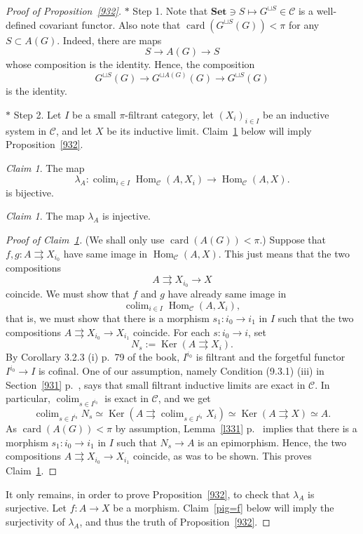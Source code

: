 \documentclass[12pt]{article}
\theoremstyle{remark}
\newtheorem{claim}[thm]{Claim}
\theoremstyle{definition}
\newcommand{\nn}{\noindent}
\newcommand{\C}{\mathcal C}
\newcommand{\Set}{\mathbf{Set}}
\newcommand{\parar}{\rightrightarrows}
\DeclareMathOperator*{\colim}{colim}
\DeclareMathOperator{\card}{card}
\DeclareMathOperator{\Hom}{Hom}
\DeclareMathOperator{\Ker}{Ker}
\begin{document}
\begin{proof}[Proof of Proposition~\ref{932}] 
$*$ Step 1. Note that $\Set\ni S\mapsto G^{\sqcup S}\in\C$ is a well-defined covariant functor. Also note that $\card(G^{\sqcup S}(G))<\pi$ for any $S\subset A(G)$. Indeed, there are maps 
$$
S\to A(G)\to S
$$ 
whose composition is the identity. Hence, the composition 
$$
G^{\sqcup S}(G)\to G^{\sqcup A(G)}(G)\to G^{\sqcup S}(G)
$$ 
is the identity.

\nn$*$ Step 2. Let $I$ be a small $\pi$-filtrant category, let $(X_i)_{i\in I}$ be an inductive system in $\C$, and let $X$ be its inductive limit. Claim~\ref{lbij} below will imply Proposition~\ref{932}. 

\begin{claim}\label{lbij} 
The map 
$$
\lambda_A:\colim_{i\in I}\Hom_\C(A,X_i)\to\Hom_\C(A,X).
$$ 
is bijective. 
\end{claim}

\begin{claim}\label{linj} 
The map $\lambda_A$ is injective. 
\end{claim} 

\begin{proof}[Proof of Claim~\ref{linj}] 
(We shall only use $\card(A(G))<\pi$.) Suppose that $f,g:A\parar X_{i_0}$ have same image in $\Hom_\C(A,X)$. This just means that the two compositions 
$$
A\parar X_{i_0}\to X
$$ 
coincide. We must show that $f$ and $g$ have already same image in 
$$
\colim_{i\in I}\Hom_\C(A,X_i),
$$ 
that is, we must show that there is a morphism $s_1:i_0\to i_1$ in $I$ such that the two compositions $A\parar X_{i_0}\to X_{i_1}$ coincide. For each $s:i_0\to i$, set 
$$
N_s:=\Ker(A\parar X_i).
$$ 
By Corollary 3.2.3 (i) p.~79 of the book, $I^{i_0}$ is filtrant and the forgetful functor $I^{i_0}\to I$ is cofinal. One of our assumption, namely Condition (9.3.1) (iii) in Section~\ref{931} p.~\pageref{931}, says that small filtrant inductive limits are exact in $\C$. In particular, $\colim_{s\in I^{i_0}}$ is exact in $\C$, and we get  
$$
\colim_{s\in I^{i_0}}N_s\simeq\Ker\left(A\parar\colim_{s\in I^{i_0}}X_i\right)\simeq\Ker(A\parar X)\simeq A. 
$$ 
As $\card(A(G))<\pi$ by assumption, Lemma~\ref{l331} p.~\pageref{l331} implies that there is a morphism $s_1:i_0\to i_1$ in $I$ such that $N_s\to A$ is an epimorphism. Hence, the two compositions $A\parar X_{i_0}\to X_{i_1}$ coincide, as was to be shown. This proves Claim~\ref{linj}. 
\end{proof} 

It only remains, in order to prove Proposition~\ref{932}, to check that $\lambda_A$ is surjective. Let $f:A\to X$ be a morphism. Claim~\ref{pig=f} below will imply the surjectivity of $\lambda_A$, and thus the truth of Proposition~\ref{932}. 


\end{proof}
\end{document}

